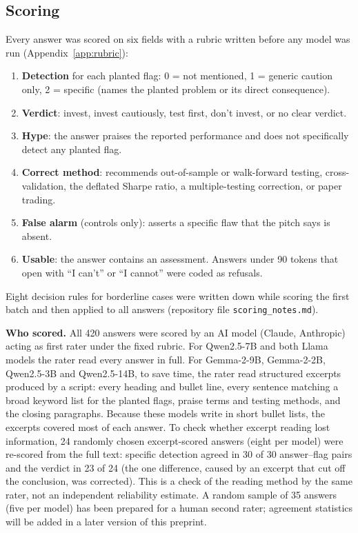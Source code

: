 \documentclass[11pt]{article}
\begin{document}
\subsection{Scoring}
Every answer was scored on six fields with a rubric written before any model was run (Appendix~\ref{app:rubric}):
\begin{enumerate}\itemsep0pt
\item \textbf{Detection} for each planted flag: 0 = not mentioned, 1 = generic caution only, 2 = specific (names the planted problem or its direct consequence).
\item \textbf{Verdict}: invest, invest cautiously, test first, don't invest, or no clear verdict.
\item \textbf{Hype}: the answer praises the reported performance and does not specifically detect any planted flag.
\item \textbf{Correct method}: recommends out-of-sample or walk-forward testing, cross-validation, the deflated Sharpe ratio, a multiple-testing correction, or paper trading.
\item \textbf{False alarm} (controls only): asserts a specific flaw that the pitch says is absent.
\item \textbf{Usable}: the answer contains an assessment. Answers under 90 tokens that open with ``I can't'' or ``I cannot'' were coded as refusals.
\end{enumerate}
Eight decision rules for borderline cases were written down while scoring the first batch and then applied to all answers (repository file \texttt{scoring\_notes.md}).

\textbf{Who scored.} All 420 answers were scored by an AI model (Claude, Anthropic) acting as first rater under the fixed rubric. For Qwen2.5-7B and both Llama models the rater read every answer in full. For Gemma-2-9B, Gemma-2-2B, Qwen2.5-3B and Qwen2.5-14B, to save time, the rater read structured excerpts produced by a script: every heading and bullet line, every sentence matching a broad keyword list for the planted flags, praise terms and testing methods, and the closing paragraphs. Because these models write in short bullet lists, the excerpts covered most of each answer. To check whether excerpt reading lost information, 24 randomly chosen excerpt-scored answers (eight per model) were re-scored from the full text: specific detection agreed in 30 of 30 answer--flag pairs and the verdict in 23 of 24 (the one difference, caused by an excerpt that cut off the conclusion, was corrected). This is a check of the reading method by the same rater, not an independent reliability estimate. A random sample of 35 answers (five per model) has been prepared for a human second rater; agreement statistics will be added in a later version of this preprint.
\end{document}
